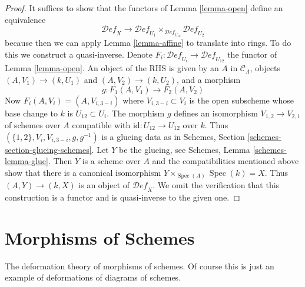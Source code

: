 \documentclass{stacks-project}
\theoremstyle{plain}
\theoremstyle{definition}
\theoremstyle{remark}
\numberwithin{equation}{subsection}
\def\Spec{\mathop{\mathrm{Spec}}}
\def\Deformationcategory{\mathcal{D}\!\mathit{ef}}
\begin{document}
\begin{proof}
It suffices to show that the functors of Lemma \ref{lemma-open}
define an equivalence
$$
\Deformationcategory_X \longrightarrow
\Deformationcategory_{U_1}
\times_{\Deformationcategory_{U_{12}}}
\Deformationcategory_{U_2}
$$
because then we can apply Lemma \ref{lemma-affine} to translate into rings.
To do this we construct a quasi-inverse. Denote
$F_i : \Deformationcategory_{U_i} \to \Deformationcategory_{U_{12}}$
the functor of Lemma \ref{lemma-open}.
An object of the RHS is given by an $A$ in $\mathcal{C}_\Lambda$,
objects $(A, V_1) \to (k, U_1)$ and $(A, V_2) \to (k, U_2)$, and
a morphism
$$
g : F_1(A, V_1) \to F_2(A, V_2)
$$
Now $F_i(A, V_i) = (A, V_{i, 3 - i})$ where $V_{i, 3 - i} \subset V_i$
is the open subscheme whose base change to $k$ is $U_{12} \subset U_i$.
The morphism $g$ defines an isomorphism
$V_{1, 2} \to V_{2, 1}$ of schemes over $A$ compatible
with $\text{id} : U_{12} \to U_{12}$ over $k$.
Thus $(\{1, 2\}, V_i, V_{i, 3 - i}, g, g^{-1})$ is a glueing
data as in Schemes, Section \ref{schemes-section-glueing-schemes}.
Let $Y$ be the glueing, see Schemes, Lemma \ref{schemes-lemma-glue}.
Then $Y$ is a scheme over $A$ and the
compatibilities mentioned above show that
there is a canonical isomorphism
$Y \times_{\Spec(A)} \Spec(k) = X$.
Thus $(A, Y) \to (k, X)$ is an object of $\Deformationcategory_X$.
We omit the verification that this construction is a functor
and is quasi-inverse to the given one.
\end{proof}






\section{Morphisms of Schemes}
\label{section-schemes-morphisms}

\noindent
The deformation theory of morphisms of schemes.
Of course this is just an example of
deformations of diagrams of schemes.
\end{document}
